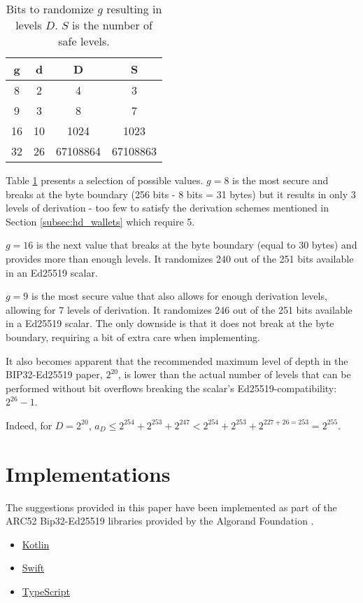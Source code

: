 \documentclass[12pt, a4paper, twocolumn]{article}
\begin{document}
\begin{table}[h]
  \centering
  \begin{tabular}{|c|c|c|c|}
  \hline
  g & d  & D & S  \\
  \hline
  8 & 2 & 4 & 3 \\
  9 & 3 & 8 & 7 \\
  16 & 10 & 1024 & 1023 \\
  32 & 26 & 67108864 & 67108863  \\
  \hline
  \end{tabular}
  \caption{Bits to randomize $g$ resulting in levels $D$. $S$ is the number of safe levels.}
  \label{tab:g_and_d}
  \end{table}


Table \ref{tab:g_and_d} presents a selection of possible values. $g=8$ is the most secure and breaks at the byte boundary (256 bits - 8 bits = 31 bytes) but it results in only 3 levels of derivation - too few to satisfy the derivation schemes mentioned in Section \ref{subsec:hd_wallets} which require 5.

$g=16$ is the next value that breaks at the byte boundary (equal to 30 bytes) and provides more than enough levels. It randomizes 240 out of the 251 bits available in an Ed25519 scalar.

$g=9$ is the most secure value that also allows for enough derivation levels, allowing for 7 levels of derivation. It randomizes 246 out of the 251 bits available in a Ed25519 scalar. The only downside is that it does not break at the byte boundary, requiring a bit of extra care when implementing.

It also becomes apparent that the recommended maximum level of depth in the BIP32-Ed25519 paper, $2^{20}$, is lower than the actual number of levels that can be performed without bit overflows breaking the scalar's Ed25519-compatibility: $2^{26} - 1$.

Indeed, for $D=2^{20}$, $a_{D} \leq 2^{254} + 2^{253} + 2^{247} < 2^{254} + 2^{253} + 2^{227+26=253} = 2^{255}$.


\section{Implementations}


The suggestions provided in this paper have been implemented as part of the ARC52 Bip32-Ed25519 libraries provided by the Algorand Foundation \cite{AF}.

\begin{itemize}
  \item \href{https://github.com/algorandfoundation/bip32-ed25519-kotlin}{Kotlin}
  \item \href{https://github.com/algorandfoundation/bip32-ed25519-swift}{Swift}
  \item \href{https://github.com/ehanoc/ARCs/tree/wallet-api-context/assets/arc-0052}{TypeScript}
\end{itemize}
\end{document}
